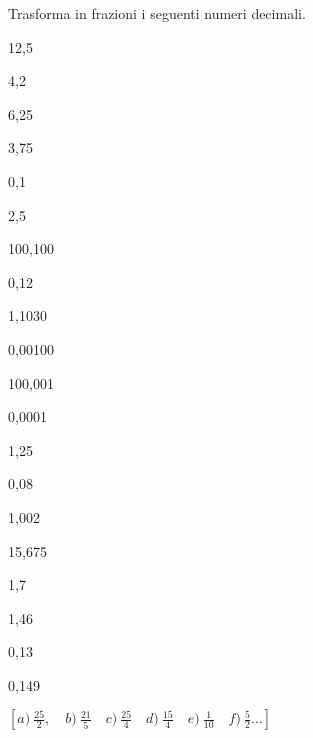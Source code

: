 \begin{esercizio}[*]
\label{ese:3.21}
Trasforma in frazioni i seguenti numeri decimali.

\begin{htmulticols}{5}
\begin{enumeratees}
 \item 12,5
 \item 4,2
 \item 6,25
 \item 3,75
 \item 0,1
 \item 2,5
 \item 100,100
 \item 0,12
 \item 1,1030
 \item 0,00100
 \item 100,001
 \item 0,0001
 \item 1,25
 \item 0,08
 \item 1,002
 \item 15,675
 \item 1,7
 \item 1,46
 \item 0,13
 \item 0,149
\end{enumeratees}
\end{htmulticols}
\(\left[a)~\frac{25}{2},\quad b)~\frac{21}{5}\quad c)~\frac{25}{4}\quad 
d)~\frac{15}{4}\quad e)~\frac{1}{10}\quad f)~\frac{5}{2} \dots \right]\)
\end{esercizio}


\begin{comment}
\begin{esercizio}
 \label{ese:3.22}
Completa la tabella.

 \begin{tabular*}{.9\textwidth}{@{\extracolsep{\fill}}*{6}{lccccc}}
 \toprule
 &\multicolumn{2}{c}{Parte}& & &\\
 Numero decimale & intera & decimale & Periodo & Antiperiodo & Frazione\\
 \midrule
 1,7521& & & & &\\
~\(3,\overline{75}\)& & & & &\\
~\(12,1\overline{24}\)& & & & &\\
~\(1,0\overline{5}~\)& & & & &\\
~\(0,13\overline{57}~\)& & & & &\\
 \bottomrule
 \end{tabular*}
\end{esercizio}

\end{comment} 

